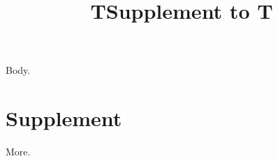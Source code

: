 \begin{frontmatter}
\title{T}
\begin{keyword}\end{keyword}
\end{frontmatter}
Body.
\section*{Supplement}
\begin{frontmatter}
\title{Supplement to T}
\begin{keyword}\end{keyword}
\end{frontmatter}
More.

